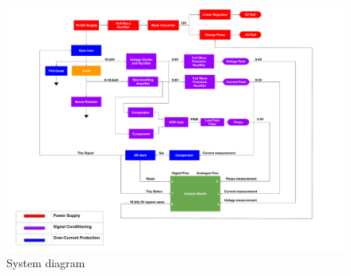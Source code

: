\begin{figure}[h]
    \centering
    \includegraphics[width = 1\linewidth]{Figures/system_diagram.pdf}
    \caption{System diagram}
    \label{fig:system_diagram}
\end{figure}











